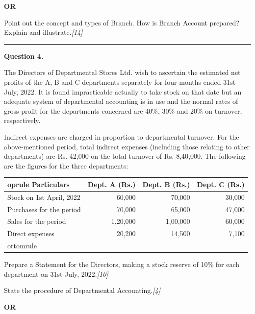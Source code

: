 \documentclass[11pt,a4paper]{article}
\newcommand{\pts}[1]{\hfill   \textit{[#1]}}
\begin{document}
\centerline{   \textbf{OR}}

Point out the concept and types of Branch. How is Branch Account prepared? Explain and illustrate.\pts{14}

\medskip\rule{\linewidth}{0.2pt}




\noindent   \textbf{Question 4.}

\begin{parts}
  \item The Directors of Departmental Stores Ltd. wish to ascertain the estimated net profits of the A, B and C departments separately for four months ended 31st July, 2022. It is found impracticable actually to take stock on that date but an adequate system of departmental accounting is in use and the normal rates of gross profit for the departments concerned are 40\%, 30\% and 20\% on turnover, respectively.
  
  Indirect expenses are charged in proportion to departmental turnover. For the above-mentioned period, total indirect expenses (including those relating to other departments) are Rs. 42,000 on the total turnover of Rs. 8,40,000. The following are the figures for the three departments:
  
  
\begin{center}
    
\begin{tabular}{lrrr}
       oprule
   \textbf{Particulars} &   \textbf{Dept. A (Rs.)} &   \textbf{Dept. B (Rs.)} &   \textbf{Dept. C (Rs.)} \\
      \midrule
      Stock on 1st April, 2022 & 60,000 & 70,000 & 30,000 \\
      Purchases for the period & 70,000 & 65,000 & 47,000 \\
      Sales for the period & 1,20,000 & 1,00,000 & 60,000 \\
      Direct expenses & 20,200 & 14,500 & 7,100 \\
      ottomrule
    \end{tabular}
  \end{center}
  
  Prepare a Statement for the Directors, making a stock reserve of 10\% for each department on 31st July, 2022.\pts{10}
  
  \item State the procedure of Departmental Accounting.\pts{4}
\end{parts}

\centerline{   \textbf{OR}}
\end{document}
